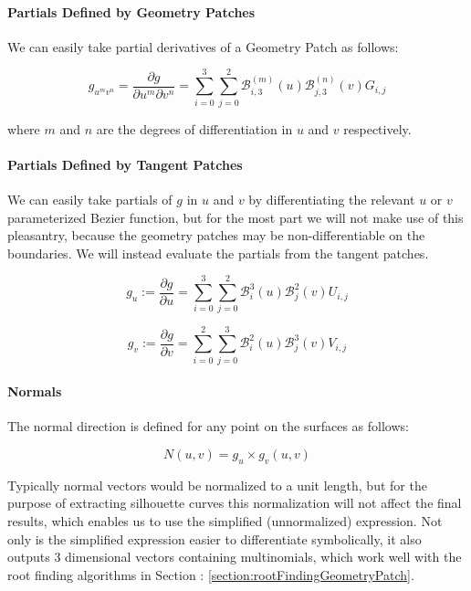 \documentclass[12pt, letterpaper]{article}
\begin{document}
		\paragraph{Partials Defined by Geometry Patches}

		We can easily take partial derivatives of a Geometry Patch as follows:

		$$g_{u^{m}v^{n}} = \frac{\partial g}{\partial u^{m} \partial v^{n}} = \sum_{i=0}^{3}{\sum_{j=0}^{2}{\mathcal{B}_{i, 3}^{(m)}(u) \mathcal{B}_{j, 3}^{(n)}(v) G_{i, j}}}$$

		where $m$ and $n$ are the degrees of differentiation in $u$ and $v$ respectively.

		\newpage

		\paragraph{Partials Defined by Tangent Patches}
		
		We can easily take partials of $g$ in $u$ and $v$ by differentiating the relevant $u$ or $v$ parameterized Bezier function,
		but for the most part we will not make use of this pleasantry, because the geometry patches may be non-differentiable on the boundaries.
		We will instead evaluate the partials from the tangent patches.
		
		\begin{equation} \label{eq:g_u}
		g_{u} := \frac{\partial g}{\partial u} = \sum_{i=0}^{3}{\sum_{j=0}^{2}{\mathcal{B}_{i}^{3}(u) \mathcal{B}_{j}^{2}(v) U_{i, j}}}
		\end{equation}

		\begin{equation} \label{eq:g_v}
		g_{v} := \frac{\partial g}{\partial v} = \sum_{i=0}^{2}{\sum_{j=0}^{3}{\mathcal{B}_{i}^{2}(u) \mathcal{B}_{j}^{3}(v) V_{i, j}}}
		\end{equation}

		\paragraph{Normals}

		The normal direction is defined for any point on the surfaces as follows:

		$$N(u,v) = g_{u} \times g_{v} (u, v)$$

		Typically normal vectors would be normalized to a unit length, but for the purpose of extracting silhouette curves
		this normalization will not affect the final results, which enables us to use the simplified (unnormalized) expression.
		Not only is the simplified expression easier to differentiate symbolically, it also outputs 3 dimensional vectors containing multinomials,
		which work well with the root finding algorithms in Section : \ref{section:rootFindingGeometryPatch}.
		
\end{document}
